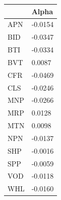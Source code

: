 \documentclass[11pt,preprint, authoryear]{elsarticle}
\let\origtable\table
\let\endorigtable\endtable
\renewenvironment{table}[1][2] {
    \expandafter\origtable\expandafter[H]
} {
    \endorigtable
}
\numberwithin{equation}{section}
\numberwithin{figure}{section}
\numberwithin{table}{section}
\begin{document}
\begin{table}[H]

\caption{\label{tab:Alpha_I}Factor Alpha's: Industrial}
\centering
\begin{tabular}[t]{l|l}
\hline
  & Alpha\\
\hline
APN & -0.0154\\
\hline
BID & -0.0347\\
\hline
BTI & -0.0334\\
\hline
BVT & 0.0087\\
\hline
CFR & -0.0469\\
\hline
CLS & -0.0246\\
\hline
MNP & -0.0266\\
\hline
MRP & 0.0128\\
\hline
MTN & 0.0098\\
\hline
NPN & -0.0137\\
\hline
SHP & -0.0016\\
\hline
SPP & -0.0059\\
\hline
VOD & -0.0118\\
\hline
WHL & -0.0160\\
\hline
\end{tabular}
\end{table}
\end{document}
